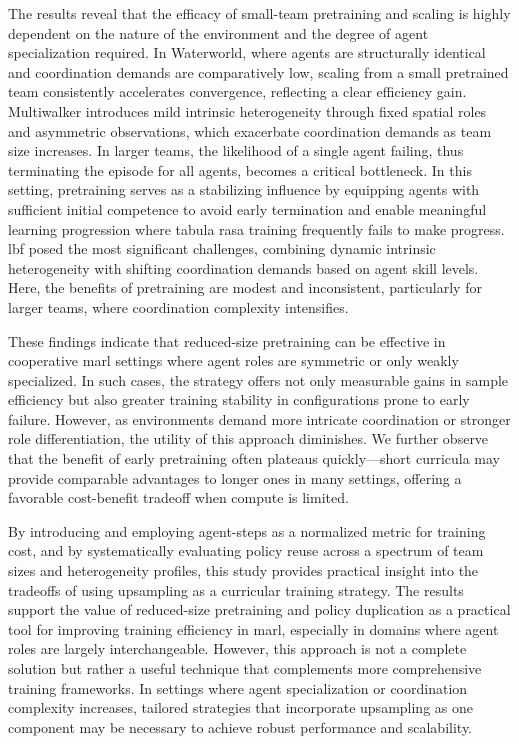 \documentclass{article}
\begin{document}
The results reveal that the efficacy of small-team pretraining and scaling is highly dependent 
on the nature of the environment and the degree of agent specialization required. 
In Waterworld, 
where agents are structurally identical and coordination demands are comparatively low, 
scaling from a small pretrained team consistently accelerates convergence, 
reflecting a clear efficiency gain. 
Multiwalker introduces mild intrinsic heterogeneity through fixed spatial roles and 
asymmetric observations, which exacerbate coordination demands as team size increases. 
In larger teams, the likelihood of a single agent failing, thus terminating the episode 
for all agents, becomes a critical bottleneck. In this setting, pretraining serves as a 
stabilizing influence by equipping agents with sufficient initial competence to avoid 
early termination and enable meaningful learning progression where tabula rasa training 
frequently fails to make progress.
\gls{lbf} posed the most significant challenges, 
combining dynamic intrinsic heterogeneity with shifting coordination 
demands based on agent skill levels. 
Here, the benefits of pretraining are modest and inconsistent, 
particularly for larger teams, where coordination complexity intensifies.

These findings indicate that reduced-size pretraining can be effective in cooperative \gls{marl} 
settings where agent roles are symmetric or only weakly specialized. In such cases, 
the strategy offers not only measurable gains in sample efficiency but also greater 
training stability in configurations prone to early failure. However, as environments 
demand more intricate coordination or stronger role differentiation, the utility of 
this approach diminishes. We further observe that the benefit of early pretraining 
often plateaus quickly—short curricula may provide comparable advantages to longer 
ones in many settings, offering a favorable cost-benefit tradeoff when compute is limited.

By introducing and employing agent-steps as a normalized metric for training cost, and by 
systematically evaluating policy reuse across a spectrum of team sizes and heterogeneity 
profiles, this study provides practical insight into the tradeoffs of using upsampling 
as a curricular training strategy. The results support the value of reduced-size pretraining 
and policy duplication as a practical tool for improving training efficiency in \gls{marl}, 
especially in domains where agent roles are largely interchangeable. However, this approach 
is not a complete solution but rather a useful technique that complements 
more comprehensive training frameworks. In settings where agent specialization or 
coordination complexity increases, tailored strategies that incorporate upsampling as 
one component may be necessary to achieve robust performance and scalability.
\end{document}
